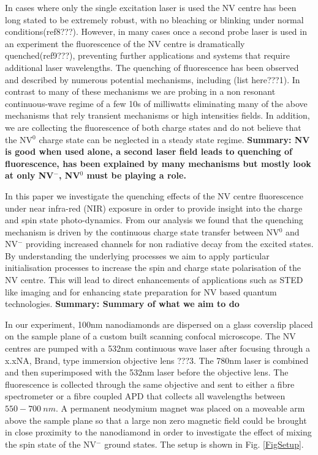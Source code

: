 \documentclass[prl]{revtex4}
\begin{document}
In cases where only the single excitation laser is used the NV centre has been long stated to be extremely robust, with no bleaching or blinking under normal conditions(ref8???). However, in many cases once a second probe laser is used in an experiment the fluorescence of the NV centre is dramatically quenched(ref9???), preventing further applications and systems that require additional laser wavelengths. The quenching of fluorescence has been observed and described by numerous potential mechanisms, including (list here???1). In contrast to many of these mechanisms we are probing in a non resonant continuous-wave regime of a few 10s of milliwatts eliminating many of the above mechanisms that rely transient mechanisms or high intensities fields. In addition, we are collecting the fluorescence of both charge states and do not believe that the NV$^0$ charge state can be neglected in a steady state regime. \textbf{Summary: NV is good when used alone, a second laser field leads to quenching of fluorescence, has been explained by many mechanisms but mostly look at only NV$^-$, NV$^0$ must be playing a role.}

In this paper we investigate the quenching effects of the NV centre fluorescence under near infra-red (NIR) exposure in order to provide insight into the charge and spin state photo-dynamics. From our analysis we found that the quenching mechanism is driven by the continuous charge state transfer between NV$^0$ and NV$^-$ providing increased channels for non radiative decay from the excited states. By understanding the underlying processes we aim to apply particular initialisation processes to increase the spin and charge state polarisation of the NV centre. This will lead to direct enhancements of applications such as STED like imaging and for enhancing state preparation for NV based quantum technologies.
\textbf{Summary: Summary of what we aim to do}

In our experiment, 100nm nanodiamonds are dispersed on a glass coverslip placed on the sample plane of a custom built scanning confocal microscope. The NV centres are pumped with a 532nm continuous wave laser after focusing through a x.xNA, Brand, type immersion objective lens ???3. The 780nm laser is combined and then superimposed with the 532nm laser before the objective lens. The fluorescence is collected through the same objective and sent to either a fibre spectrometer or a fibre coupled APD that collects all wavelengths between $550-\SI{700}{nm}$. A permanent neodymium magnet was placed on a moveable arm above the sample plane so that a large non zero magnetic field could be brought in close proximity to the nanodiamond in order to investigate the effect of mixing the spin state of the NV$^-$ ground states. The setup is shown in Fig. \ref{FigSetup}.
\end{document}
